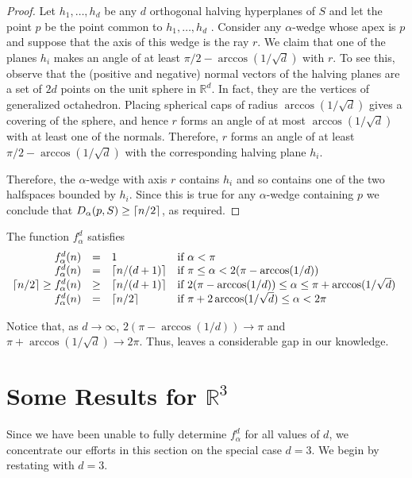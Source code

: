 \documentclass[lotsofwhite]{patmorin}
\begin{document}
\begin{proof}
Let $h_1,\ldots,h_d$ be any $d$ orthogonal halving hyperplanes of $S$
and let the point $p$ be the point common to $h_1,\ldots,h_d$ .
Consider any $\alpha$-wedge whose apex is $p$ and suppose that the
axis of this wedge is the ray $r$.  We claim that one of the planes
$h_i$ makes an angle of at least $\pi/2-\arccos(1/\sqrt{d})$ with $r$.
To see this, observe that the (positive and negative) normal vectors
of the halving planes are a set of $2d$ points on the unit sphere in
$\mathbb{R}^d$.  In fact, they are the vertices of generalized
octahedron. Placing spherical caps of radius $\arccos(1/\sqrt{d})$
gives a covering of the sphere, and hence $r$ forms an angle of at
most $\arccos(1/\sqrt{d})$ with at least one of the normals.
Therefore, $r$ forms an angle of at least $\pi/2-\arccos(1/\sqrt{d})$
with the corresponding halving plane $h_i$.

Therefore, the $\alpha$-wedge with axis $r$ contains $h_i$ and so
contains one of the two halfspaces bounded by $h_i$.  Since this is
true for any $\alpha$-wedge containing $p$ we conclude that
$D_\alpha(p,S)\ge\left\lceil n/2 \right\rceil$, as required.  
\end{proof}

\begin{thm}
The function $f_\alpha^d$ satisfies
\[\begin{array}{rcll}
  f^d_\alpha(n) & = & 1 & \mbox{if $\alpha < \pi$} \\
  f^d_\alpha(n) & = & \left\lceil n/(d+1) \right\rceil & \mbox{if $\pi\le \alpha <
2(\pi-\arccos(1/d))$} \\
\left\lceil n/2 \right\rceil\ge  f^d_\alpha(n) & \ge & \left\lceil n/(d+1) \right\rceil & \mbox{if
$2(\pi-\arccos(1/d)) \le \alpha \le \pi+\arccos(1/\sqrt{d})$ } \\
  f^d_\alpha(n) & = & \left\lceil n/2 \right\rceil & \mbox{if
$\pi+2\arccos(1/\sqrt{d})\le \alpha < 2\pi$} \\
\end{array}\]
\end{thm}

Notice that, as $d\rightarrow\infty$, $2(\pi-\arccos(1/d))\rightarrow
\pi$ and $\pi+\arccos(1/\sqrt{d})\rightarrow 2\pi$.  Thus,
 leaves a considerable gap in our knowledge.


\section{Some Results for $\mathbb{R}^3$}

Since we have been unable to fully determine $f^d_\alpha$ for all
values of $d$, we concentrate our efforts in this section on the
special case $d=3$.  We begin by restating  with $d=3$.
\end{document}
